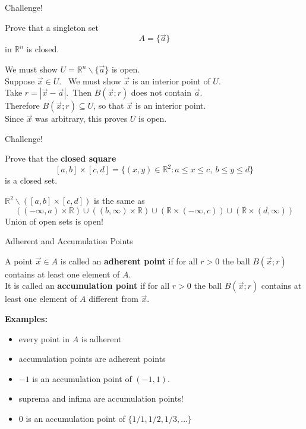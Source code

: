 \documentclass{beamer}
\begin{document}
\begin{frame}{Challenge!}
\begin{prob}
Prove that a singleton set
$$A = \{\vec a\}$$
in $\mathbb{R}^n$ is closed.
\end{prob}
\pause
\begin{soln}
We must show $U = \mathbb{R}^n\backslash\{\vec a\}$ is open.\\\pause
Suppose $\vec x\in U$.\ \pause
We must show $\vec x$ is an interior point of $U$.\\\pause
Take $r = |\vec x-\vec a|$.\ \pause Then $B(\vec x; r)$ does not contain $\vec a$.\\\pause
Therefore $B(\vec x; r)\subseteq U$, so that $\vec x$ is an interior point.\\\pause
Since $\vec x$ was arbitrary, this proves $U$ is open.
\end{soln}
\end{frame}

\begin{frame}{Challenge!}
\begin{prob}
Prove that the \textbf{closed square}
$$[a,b]\times [c,d] = \{(x,y)\in\mathbb{R}^2: a \leq x \leq c,\ b\leq y\leq d\}$$
is a closed set.
\end{prob}
\pause
\begin{soln}
$\mathbb{R}^2\backslash ([a,b]\times [c,d])$ is the same as
$$((-\infty,a)\times \mathbb{R})\cup ((b,\infty)\times \mathbb{R})\cup(\mathbb{R}\times (-\infty,c))\cup (\mathbb{R}\times (d,\infty))$$
\pause
Union of open sets is open!
\end{soln}
\end{frame}


\begin{frame}{Adherent and Accumulation Points}
\begin{defn}
A point $\vec x\in A$ is called an \textbf{adherent point} if for all $r > 0$ the ball $B(\vec x; r)$ contains at least one element of $A$.\\
\pause
It is called an \textbf{accumulation point} if for all $r > 0$ the ball $B(\vec x; r)$ contains at least one element of $A$ {\color{red} different from $\vec x$}.
\end{defn}
\pause
\textbf{Examples:}
\begin{itemize}
\pause
\item every point in $A$ is adherent
\pause
\item accumulation points are adherent points
\pause
\item $-1$ is an accumulation point of $(-1,1)$.
\pause
\item suprema and infima are accumulation points!
\pause
\item $0$ is an accumulation point of $\{1/1,1/2,1/3,\dots\}$
\end{itemize}
\end{frame}
\end{document}
